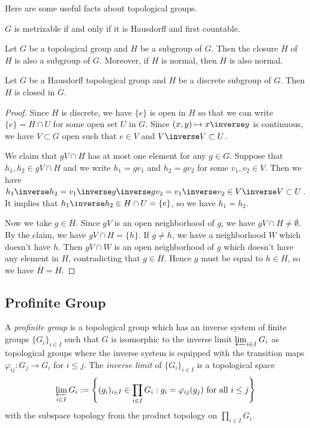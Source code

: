 Here are some useful facts about topological groups.
\begin{theorem}
    $G$ is metrizable if and only if it is Hausdorff and first countable.
\end{theorem}
\begin{theorem}Let $G$ be a topological group and $H$ be a subgroup of $G$.
        Then the closure $\overline{H}$ of $H$ is also a subgroup of $G$.
        Moreover, if $H$ is normal, then $\overline{H}$ is also normal.
\end{theorem}
\begin{theorem}
    Let $G$ be a Hausdorff topological group and $H$ be a discrete subgroup of $G$.
    Then $H$ is closed in $G$.
\end{theorem}
\begin{proof}
    Since $H$ is discrete, we have $\{e\}$ is open in $H$ so that we can write $\{e\} = H \cap U$ for some open set $U$ in $G$.
    Since $(x, y) \mapsto x\inverse y$ is continuous, we have $V \subset G$ open such that $e \in V$ and $V\inverse V \subset U$.

    We claim that $gV \cap H$ has at most one element for any $g \in G$.
    Suppose that $h_1, h_2 \in gV \cap H$ and we write $h_1 = gv_1$ and $h_2 = gv_2$ for some $v_1, v_2 \in V$.
    Then we have $h_1\inverse h_2 = v_1\inverse g\inverse gv_2 = v_1\inverse v_2 \in V\inverse V \subset U$.
    It implies that $h_1\inverse h_2 \in H \cap U = \{e\}$, so we have $h_1 = h_2$.

    Now we take $g \in \overline{H}$. Since $gV$ is an open neighborhood of $g$, we have $gV \cap H \neq \emptyset$.
    By the claim, we have $gV \cap H = \{h\}$.
    If $g \neq h$, we have a neighborhood $W$ which doesn't have $h$.
    Then $gV \cap W$ is an open neighborhood of $g$ which doesn't have any element in $H$, contradicting that $g \in \overline{H}$.
    Hence $g$ must be equal to $h \in H$, so we have $\overline{H} = H$.
\end{proof}

\subsection{Profinite Group}

\begin{definition}
    A \textit{profinite group} is a topological group
    which has an inverse system of finite groups $\{G_i\}_{i \in I}$ such that
    $G$ is isomorphic to the inverse limit $\varprojlim_{i \in I} G_i$ as topological groups
    where the inverse system is equipped with the transition maps $\varphi_{ij}: G_j \to G_i$ for $i \le j$.
    The \textit{inverse limit} of $\{G_i\}_{i \in I}$ is a topological space
    $$\varprojlim_{i \in I} G_i := \left\{(g_i)_{i \in I} \in \prod_{i \in I} G_i : g_i = \varphi_{ij}(g_j) \text{ for all } i \le j\right\}$$
    with the subspace topology from the product topology on $\prod_{i \in I} G_i$.
\end{definition}

